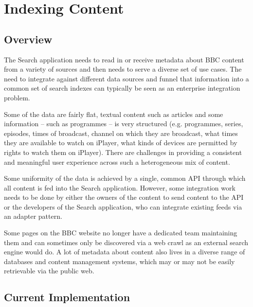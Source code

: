 \section{Indexing Content}

\subsection{Overview}

The Search application needs to read in or receive metadata about
BBC content from a variety of sources and then needs to serve
a diverse set of use cases.\cite{fenning2014applicability} The
need to integrate against different data sources and funnel
that information into a common set of search indexes can
typically be seen as an enterprise integration
problem.

Some of the data are fairly flat, textual content such as articles and some
information -- such as programmes -- is very structured (e.g. programmes,
series, episodes, times of broadcast, channel on which they are broadcast,
what times they are available to watch on iPlayer, what kinds of devices
are permitted by rights to watch them on iPlayer). There are challenges
in providing a consistent and meaningful user experience across such
a heterogeneous mix of content.

Some uniformity of the data is achieved by a single, common
API through which all content is fed into the Search application. However,
some integration work needs to be
done by either the owners of the content to send content to the API
or the developers of the Search application, who can integrate
existing feeds via an adapter pattern.

Some pages on the BBC website no
longer have a dedicated team maintaining them and can sometimes only
be discovered via a web crawl as an external search engine would do. A lot
of metadata about content also lives in a diverse range of databases and
content management systems, which may or may not be easily retrievable
via the public web.

\subsection{Current Implementation}
\label{sec:current-impl}

